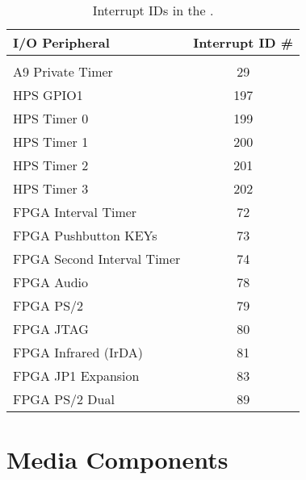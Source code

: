\begin{table}[h]
    \begin{center}
    \begin{tabular}{l|c}
          \textbf{I/O Peripheral} &
          \textbf{Interrupt ID \#}        \\
          \hline\vspace{-3mm}             \\
          A9 Private Timer & 29           \\
          HPS GPIO1 & 197                 \\
          HPS Timer 0 & 199               \\
          HPS Timer 1 & 200               \\
          HPS Timer 2 & 201               \\
          HPS Timer 3 & 202               \\
		  FPGA Interval Timer & 72        \\
		  FPGA Pushbutton KEYs & 73       \\
		  FPGA Second Interval Timer & 74 \\
		  FPGA Audio & 78                 \\
		  FPGA PS/2 & 79                  \\
		  FPGA JTAG & 80                  \\
		  FPGA Infrared (IrDA) & 81       \\
		  FPGA JP1 Expansion & 83         \\
		  FPGA PS/2 Dual & 89             \\
    \end{tabular}
    \caption{Interrupt IDs in the \systemName.}
	\label{tab:irq}
    \end{center}
\end{table}












\section{Media Components}
\label{sec:multi}

